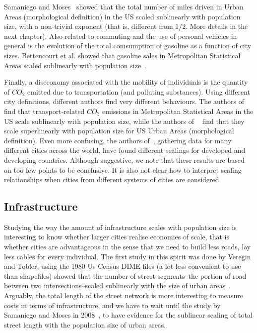 Samaniego and Moses~\cite{Samaniego:2008} showed that the total number of miles
driven in Urban Areas (morphological definition) in the US scaled sublinearly
with population size, with a non-trivial exponent (that is, different from
$1/2$. More details in the next chapter).  Also related to commuting and the use of
personal vehicles in general is the evolution of the total comsumption of
gasoline as a function of city sizes. Bettencourt et al. showed that gasoline
sales in Metropolitan Statistical Areas scaled sublinearly with population
size~\cite{Bettencourt:2007}. 

Finally, a diseconomy associated with the mobility of individuals is the
quantity of $CO_2$ emitted due to transportation (and polluting substances).
Using different city definitions, different authors find very different
behaviours. The authors of \cite{Fragkias:2013} find that transport-related
$CO_2$ emissions in Metropolitan Statistical Areas in the US scale sublinearly
with population size, while the authors of
~\cite{Louf:2014_mobility,Oliveira:2014} find that they scale superlinearly with
population size for US Urban Areas (morphological definition). Even more
confusing, the authors of~\cite{Rybksi:2013}, gathering data for many different
cities across the world, have found different scalings for developed and
developing countries. Although suggestive, we note that these results are based
on too few points to be conclusive. It is also not clear how to interpret
scaling relationships when cities from different systems of cities are
considered.


\subsection{Infrastructure}
\label{sub:infrastructure}

Studying the way the amount of infrastructure scales with population size is
interesting to know whether larger cities realise economies of scale, that is
whether cities are advantageous in the sense that we need to build less
roads, lay less cables for every individual.
The first study in this spirit was done by Veregin and Tobler, using the 1980 Us
Census DIME files (a lot less convenient to use than shapefiles) showed that the
number of street segments--the portion of road between two intersections--scaled
sublinearly with the size of urban areas~\cite{Veregin:1997}. Arguably, the
total length of the street network is more interesting to measure costs in terms
of infrastructure, and we have to wait until the study by Samaniego and Moses in
2008~\cite{Samaniego:2008}, to have evidence for the sublinear scaling of total
street length with the population size of urban areas. 

